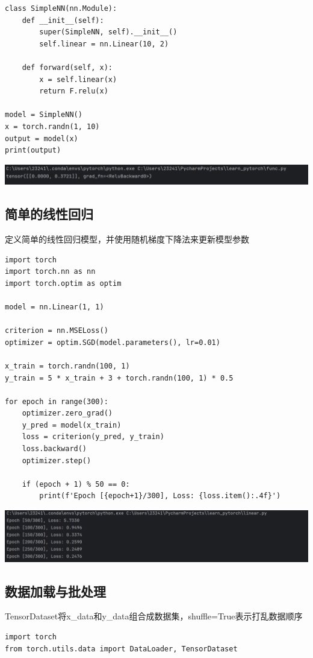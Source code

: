 \documentclass[UTF8,a4paper]{ctexart}
\begin{document}
\begin{sloppypar}
\begin{lstlisting}
class SimpleNN(nn.Module):
    def __init__(self):
        super(SimpleNN, self).__init__()
        self.linear = nn.Linear(10, 2)

    def forward(self, x):
        x = self.linear(x)
        return F.relu(x) 

model = SimpleNN()
x = torch.randn(1, 10)
output = model(x)
print(output)
    \end{lstlisting}
	
	\includegraphics[width = 16cm]{14}


	\subsection{简单的线性回归}
	定义简单的线性回归模型，并使用随机梯度下降法来更新模型参数
	\begin{lstlisting}
import torch
import torch.nn as nn
import torch.optim as optim

model = nn.Linear(1, 1)

criterion = nn.MSELoss()
optimizer = optim.SGD(model.parameters(), lr=0.01)

x_train = torch.randn(100, 1)
y_train = 5 * x_train + 3 + torch.randn(100, 1) * 0.5

for epoch in range(300):
    optimizer.zero_grad()
    y_pred = model(x_train)
    loss = criterion(y_pred, y_train)
    loss.backward()
    optimizer.step()

    if (epoch + 1) % 50 == 0:
        print(f'Epoch [{epoch+1}/300], Loss: {loss.item():.4f}')
    \end{lstlisting}
	
	\includegraphics[width = 16cm]{15}
	
	\subsection{数据加载与批处理}
	TensorDataset将x\_data和y\_data组合成数据集，shuffle=True表示打乱数据顺序
	\begin{lstlisting}
import torch
from torch.utils.data import DataLoader, TensorDataset


\end{lstlisting}
\end{sloppypar}
\end{document}
